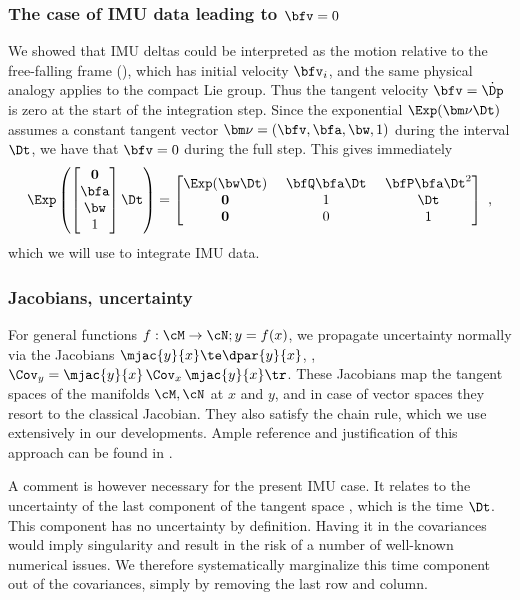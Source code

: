 \subsubsection{The case of IMU data leading to \texorpdfstring{$\bfv=0$}{bfv=0}}
\label{sec:IMU_case}

We showed that IMU deltas could be interpreted as the motion relative to the free-falling frame (), which has initial velocity $\bfv_i$, and the same physical analogy applies to the compact Lie group.
Thus the tangent velocity $\bfv=\dot\Dp$  is zero at the start of the integration step. 
%
Since the exponential $\Exp(\bm\nu\Dt)$ assumes a constant tangent vector $\bm\nu=(\bfv,\bfa,\bw,1)$ during the interval $\Dt$, we have that $\bfv=0$ during the full step. 
%
This gives immediately
%
\begin{equation}
    \Exp\left(\begin{bmatrix}
    \bf0 \\ \bfa \\ \bw \\ 1
    \end{bmatrix}\Dt\right) 
    = \begin{bmatrix}
    \Exp(\bw\Dt) & ~\bfQ\bfa\Dt~ & \bfP\bfa\Dt^2 \\
    \bf0 & 1 & \Dt \\
    \bf0 & 0 & 1
    \end{bmatrix}
    ~,
    \label{eq:exp_compact_imu}
\end{equation}
%
which we will use to integrate IMU data.


\subsubsection{Jacobians, uncertainty}
\label{sec:uncertainty}

For general functions $f:\cM\to\cN;y=f(x)$, we propagate uncertainty normally via the Jacobians 
$\mjac{y}{x}\te\dpar{y}{x}$, \ie, $\Cov_y=\mjac{y}{x}\,\Cov_x\,\mjac{y}{x}\tr$. 
These Jacobians map the tangent spaces of the manifolds $\cM,\cN$ at $x$ and $y$, and in case of vector spaces they resort to the classical Jacobian.
They also satisfy the chain rule, which we use extensively in our developments.
Ample reference and justification of this approach can be found in \cite{sola2018micro}.

A comment is however necessary for the present IMU case.
It relates to the uncertainty of the last component of the tangent space , which is the time $\Dt$. This component has no uncertainty by definition. 
Having it in the covariances would imply singularity and result in the risk of a number of well-known numerical issues. 
We therefore systematically marginalize this time component out of the covariances, simply by removing the last row and column. 






